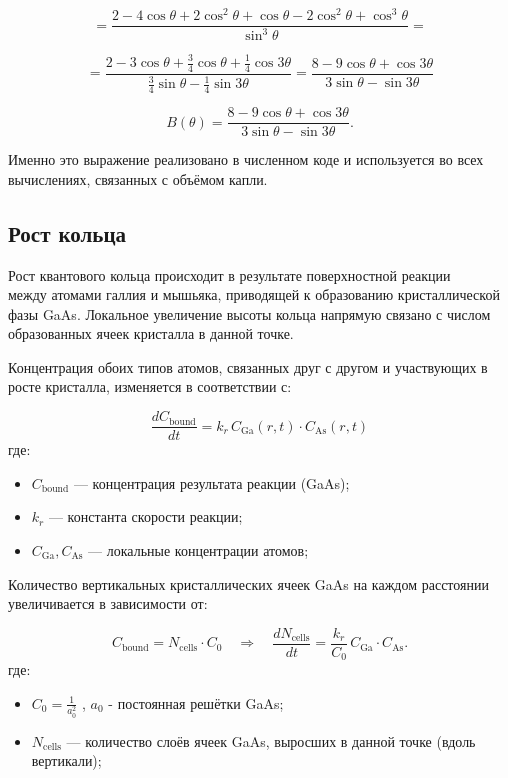 \documentclass[14pt,oneside]{extarticle}
\begin{document}
\[
=\frac{2-4\cos\theta+2\cos^{2}\theta+\cos\theta-2\cos^{2}\theta+\cos^{3}\theta}{\sin^{3}\theta}=
\]

\[
=\frac{2-3\cos\theta+\frac{3}{4}\cos\theta+\frac{1}{4}\cos3\theta}{\frac{3}{4}\sin\theta-\frac{1}{4}\sin3\theta}=\frac{8-9\cos\theta+\cos3\theta}{3\sin\theta-\sin3\theta}
\]

\begin{equation}
B(\theta) = \frac{8-9\cos\theta+\cos3\theta}{3\sin\theta-\sin3\theta}
.
\label{eq:Btheta_final}
\end{equation}

Именно это выражение реализовано в численном коде и используется во всех вычислениях, связанных с объёмом капли.

\subsection{Рост кольца}

Рост квантового кольца происходит в результате поверхностной реакции\\
между атомами галлия и мышьяка, приводящей к образованию кристаллической фазы GaAs. Локальное увеличение высоты кольца напрямую связано с числом образованных ячеек кристалла в данной точке.

Концентрация обоих типов атомов, связанных друг с другом и участвующих в росте кристалла, изменяется в соответствии с:

\[
\frac{dC_{\text{bound}}}{dt} = k_r \, C_{\text{Ga}}(r,t) \cdot C_{\text{As}}(r,t)
\]
где:
\begin{itemize}
  \item $C_{\text{bound}}$ — концентрация результата реакции (GaAs);
  \item $k_r$ — константа скорости реакции;
  \item $C_{\text{Ga}}, C_{\text{As}}$ — локальные концентрации атомов;
\end{itemize}

Количество вертикальных кристаллических ячеек GaAs на каждом расстоянии увеличивается в зависимости от:

\[
C_{\text{bound}} = N_{\text{cells}} \cdot C_0 \quad \Rightarrow \quad
\frac{dN_{\text{cells}}}{dt} = \frac{k_r}{C_0} \, C_{\text{Ga}} \cdot C_{\text{As}}.
\]
где:
\begin{itemize}
  \item $C_0 = \frac{1}{a_0^2}$ , $a_0$ - постоянная решётки GaAs;
  \item $N_{\text{cells}}$ — количество слоёв ячеек GaAs, выросших в данной точке (вдоль вертикали);
\end{itemize}
\end{document}
